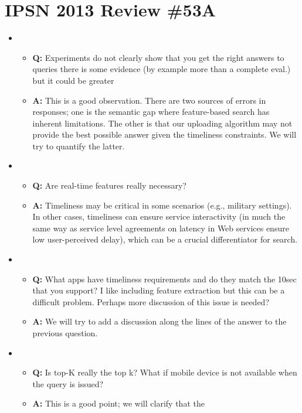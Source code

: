 \section{IPSN 2013 Review \#53A}
\begin{itemize}
\item 
\begin{itemize}
\item \textbf{Q: }Experiments do not clearly show that you get the
  right answers to queries there is some evidence (by example more
  than a complete eval.) but it could be greater
\item \textbf{A: }This is a good observation. There are two sources of
  errors in responses; one is the semantic gap where feature-based
  search has inherent limitations. The other is that our uploading
  algorithm may not provide the best possible answer given the
  timeliness constraints. We will try to quantify the latter.
\end{itemize}
\item 
\begin{itemize}
\item \textbf{Q: }Are real-time features really necessary?
\item \textbf{A: }Timeliness may be critical in some scenarios (e.g.,
  military settings). In other cases, timeliness can ensure service
  interactivity (in much the same way as service level agreements on
  latency in Web services ensure low user-perceived delay), which can
  be a crucial differentiator for search.
\end{itemize}
\item 
\begin{itemize}
\item \textbf{Q: }What apps have timeliness requirements and do they
  match the 10sec that you support?  I like including feature
  extraction but this can be a difficult problem. Perhaps more
  discussion of this issue is needed?
\item \textbf{A: }We will try to add a discussion along the lines of
  the answer to the previous question.
\end{itemize}
\item 
\begin{itemize}
\item \textbf{Q: }Is top-K really the top k? What if mobile device is
  not available when the query is issued?
\item \textbf{A: }This is a good point; we will clarify that the

\end{itemize}
\end{itemize}
